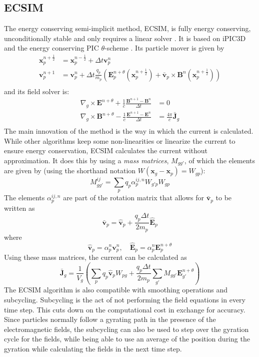 \subsection{ECSIM}
\label{subsec:plasma intro ECSIM}
The energy conserving semi-implicit method, ECSIM, is fully energy conserving, unconditionally stable and only requires a linear solver \cite{lapenta_exactly_2017}. It is based on iPIC3D \cite{markidis_multi-scale_2010} and the energy conserving PIC $\theta$-scheme \cite{brackbill_implicit_1982}. Its particle mover is given by 
\begin{align*}
	\textbf{x}_p^{n+\frac{1}{2}} &= \textbf{x}_p^{n-\frac{1}{2}} + \Delta t \textbf{v}_p^{n} \\
	\textbf{v}_p^{n+1} &= \textbf{v}_p^{n} + \Delta t \frac{q_p}{m_p}\left(\textbf{E}^{n+\theta}_p(\textbf{x}_p^{n+\frac{1}{2}}) + \bar{\textbf{v}}_p \times \textbf{B}^n(\textbf{x}_p^{n+\frac{1}{2}})\right)\\
\end{align*}
and its field solver is: 
   \begin{align*}
 	\nabla_g \times \mathbf{E}^{n + \theta} +\frac{1}{c}\frac{\mathbf{B}^{n+1} - \mathbf{B}^{n}}{\Delta t} &= 0 \\
 	\nabla_g \times \mathbf{B}^{n+ \theta} -\frac{1}{c}\frac{\mathbf{E}^{n+1} - \mathbf{E}^{n}}{\Delta t} &= \frac{4 \pi}{c}\bar{\mathbf{J}}_g\\
 \end{align*}
 The main innovation of the method is the way in which the current is calculated. While other algorithms keep some non-linearities or linearize the current to ensure energy conservation, ECSIM calculates the current without approximation. It does this by using a \textit{mass matrices}, $M_{gg'}$, of which the elements are given by (using the shorthand notation $W(\textbf{x}_g- \textbf{x}_p)= W_{gp}$): \[
 M^{ij}_{g g'} = \sum_p q_p \alpha_p^{ij,n} W_{g'p} W_{gp}\]
 The elements $\alpha_p^{ij,n}$ are part of the rotation matrix that allows for $\bar{\textbf{v}}_p$ to be written as \[\bar{\textbf{v}}_p = \hat{\textbf{v}}_p + \frac{q_p \Delta t}{2 m_p}\hat{\textbf{E}}_p\]
 where 
 \[ \hat{\textbf{v}}_p = \alpha^n_p \textbf{v}_p^n, \quad \hat{\textbf{E}}_p = \alpha^n_p \textbf{E}_p^{n+\theta}
 \]
 Using these mass matrices, the current can be calculated as 
 \[\bar{\textbf{J}}_g = \frac{1}{V_g}\left(\sum_p q_p \hat{\textbf{v}}_p W_{pg} + \frac{q_p \Delta t}{2 m_p}\sum_{g'}M_{g g'} \textbf{E}^{n+\theta}_{g'}\right)\]
The ECSIM algorithm is also compatible with smoothing operations and subcycling. Subcycling is the act of not performing the field equations in every time step. This cuts down on the computational cost in exchange for accuracy. Since particles normally follow a gyrating path in the presence of the electromagnetic fields, the subcycling can also be used to step over the gyration cycle for the fields, while being able to use an average of the position during the gyration while calculating the fields in the next time step.

